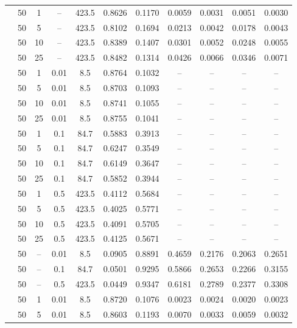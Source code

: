 \begin{longtable}{@{}l c c c c c c c c c c@{}}
	\arrayrulecolor{gray!60}\midrule\arrayrulecolor{black}
	\multirow{4}{*}{\textbf{DP + FLTrust}} & 50 & 1 & -- & 423.5 & 0.8626 & 0.1170 & 0.0059 & 0.0031 & 0.0051 & 0.0030 \\
	& 50 & 5 & -- & 423.5 & 0.8102 & 0.1694 & 0.0213 & 0.0042 & 0.0178 & 0.0043 \\
	& 50 & 10 & -- & 423.5 & 0.8389 & 0.1407 & 0.0301 & 0.0052 & 0.0248 & 0.0055 \\
	& 50 & 25 & -- & 423.5 & 0.8482 & 0.1314 & 0.0426 & 0.0066 & 0.0346 & 0.0071 \\
	\arrayrulecolor{gray!60}\midrule\arrayrulecolor{black}
	\multirow{12}{*}{\textbf{DP + TopK}} & 50 & 1 & 0.01 & 8.5 & 0.8764 & 0.1032 & -- & -- & -- & -- \\
	& 50 & 5 & 0.01 & 8.5 & 0.8703 & 0.1093 & -- & -- & -- & -- \\
	& 50 & 10 & 0.01 & 8.5 & 0.8741 & 0.1055 & -- & -- & -- & -- \\
	& 50 & 25 & 0.01 & 8.5 & 0.8755 & 0.1041 & -- & -- & -- & -- \\
	& 50 & 1 & 0.1 & 84.7 & 0.5883 & 0.3913 & -- & -- & -- & -- \\
	& 50 & 5 & 0.1 & 84.7 & 0.6247 & 0.3549 & -- & -- & -- & -- \\
	& 50 & 10 & 0.1 & 84.7 & 0.6149 & 0.3647 & -- & -- & -- & -- \\
	& 50 & 25 & 0.1 & 84.7 & 0.5852 & 0.3944 & -- & -- & -- & -- \\
	& 50 & 1 & 0.5 & 423.5 & 0.4112 & 0.5684 & -- & -- & -- & -- \\
	& 50 & 5 & 0.5 & 423.5 & 0.4025 & 0.5771 & -- & -- & -- & -- \\
	& 50 & 10 & 0.5 & 423.5 & 0.4091 & 0.5705 & -- & -- & -- & -- \\
	& 50 & 25 & 0.5 & 423.5 & 0.4125 & 0.5671 & -- & -- & -- & -- \\
	\arrayrulecolor{gray!60}\midrule\arrayrulecolor{black}
	\multirow{3}{*}{\textbf{FLTrust + TopK}} & 50 & -- & 0.01 & 8.5 & 0.0905 & 0.8891 & 0.4659 & 0.2176 & 0.2063 & 0.2651 \\
	& 50 & -- & 0.1 & 84.7 & 0.0501 & 0.9295 & 0.5866 & 0.2653 & 0.2266 & 0.3155 \\
	& 50 & -- & 0.5 & 423.5 & 0.0449 & 0.9347 & 0.6181 & 0.2789 & 0.2377 & 0.3308 \\
	\arrayrulecolor{gray!60}\midrule\arrayrulecolor{black}
	\multirow{12}{*}{\textbf{ALL}} & 50 & 1 & 0.01 & 8.5 & 0.8720 & 0.1076 & 0.0023 & 0.0024 & 0.0020 & 0.0023 \\
	& 50 & 5 & 0.01 & 8.5 & 0.8603 & 0.1193 & 0.0070 & 0.0033 & 0.0059 & 0.0032 \\

\end{longtable}
